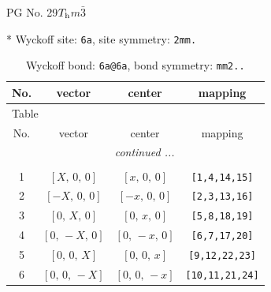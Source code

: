 \documentclass[fleqn,8pt]{jsarticle}
\begin{document}
\setcounter{MaxMatrixCols}{32}

\renewcommand{\tablename}{Table~}
\renewcommand{\figurename}{Figure~}
\begin{center}
\LARGE
PG No. 29\quad$T_{\rm h}$\quad$m\bar{3}$\quad[ cubic ]
\end{center}


* Wyckoff site: {\tt 6a}, site symmetry: {\tt 2mm.}
\renewcommand{\arraystretch}{1.2}
\begin{longtable}{cccc}
\caption{Wyckoff bond: {\tt 6a@6a}, bond symmetry: {\tt mm2..}}
 \\
 \hline \hline
No. & vector & center & mapping \\ \hline \endfirsthead

\multicolumn{3}{l}{\tablename\ \thetable{}} \\
 \hline \hline
No. & vector & center & mapping \\ \hline \endhead

 \hline \hline
\multicolumn{3}{r}{\footnotesize\it continued ...} \\ \endfoot

 \hline \hline
\multicolumn{3}{r}{} \\ \endlastfoot

1 & $\left[ X,\, 0,\, 0 \right]$ & $\left[ x,\, 0,\, 0 \right]$ & {\tt [1,4,14,15]} \\ \hline
2 & $\left[ - X,\, 0,\, 0 \right]$ & $\left[ - x,\, 0,\, 0 \right]$ & {\tt [2,3,13,16]} \\ \hline
3 & $\left[ 0,\, X,\, 0 \right]$ & $\left[ 0,\, x,\, 0 \right]$ & {\tt [5,8,18,19]} \\ \hline
4 & $\left[ 0,\, - X,\, 0 \right]$ & $\left[ 0,\, - x,\, 0 \right]$ & {\tt [6,7,17,20]} \\ \hline
5 & $\left[ 0,\, 0,\, X \right]$ & $\left[ 0,\, 0,\, x \right]$ & {\tt [9,12,22,23]} \\ \hline
6 & $\left[ 0,\, 0,\, - X \right]$ & $\left[ 0,\, 0,\, - x \right]$ & {\tt [10,11,21,24]} \\
\end{longtable}
\renewcommand{\arraystretch}{1.2}
\end{document}
